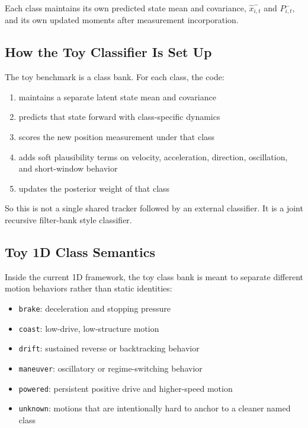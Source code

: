 \documentclass[11pt]{article}
\begin{document}
Each class maintains its own predicted state mean and covariance,
$\hat{x}_{i,t}^{-}$ and $P_{i,t}^{-}$, and its own updated moments after
measurement incorporation.

\subsection{How the Toy Classifier Is Set Up}

The toy benchmark is a class bank. For each class, the code:
\begin{enumerate}[leftmargin=1.8em]
    \item maintains a separate latent state mean and covariance
    \item predicts that state forward with class-specific dynamics
    \item scores the new position measurement under that class
    \item adds soft plausibility terms on velocity, acceleration, direction,
    oscillation, and short-window behavior
    \item updates the posterior weight of that class
\end{enumerate}

So this is not a single shared tracker followed by an external classifier. It
is a joint recursive filter-bank style classifier.

\subsection{Toy 1D Class Semantics}

Inside the current 1D framework, the toy class bank is meant to separate
different motion behaviors rather than static identities:
\begin{itemize}[leftmargin=1.5em]
    \item \texttt{brake}: deceleration and stopping pressure
    \item \texttt{coast}: low-drive, low-structure motion
    \item \texttt{drift}: sustained reverse or backtracking behavior
    \item \texttt{maneuver}: oscillatory or regime-switching behavior
    \item \texttt{powered}: persistent positive drive and higher-speed motion
    \item \texttt{unknown}: motions that are intentionally hard to anchor to a
    cleaner named class
\end{itemize}
\end{document}
